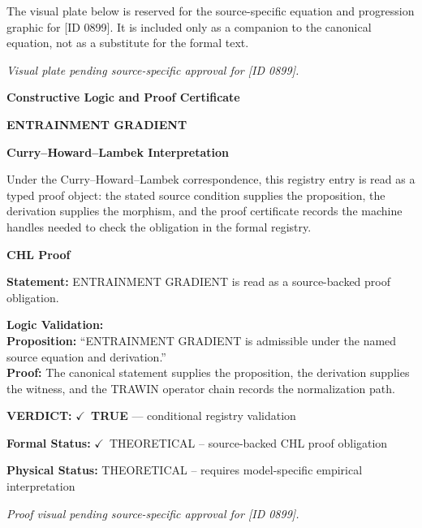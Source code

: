 \begingroup\footnotesize\sloppy
The visual plate below is reserved for the source-specific equation and progression graphic for [ID 0899]. It is included only as a companion to the canonical equation, not as a substitute for the formal text.
\par\endgroup
\begingroup\footnotesize\itshape
Visual plate pending source-specific approval for [ID 0899].
\par\endgroup

\clearpage
\begingroup\tzpsupportsetup
\noindent\textbf{\fontsize{10.8pt}{12.8pt}\selectfont [ID 0899] Constructive Logic and Proof Certificate}\par
\noindent\textbf{\fontsize{10pt}{12pt}\selectfont ENTRAINMENT GRADIENT}\par
\vspace{0.45em}
\begingroup
\footnotesize
\setlength{\parskip}{0.22em}
\setlength{\parindent}{0pt}
\noindent\textbf{Curry--Howard--Lambek Interpretation}\par
Under the Curry--Howard--Lambek correspondence, this registry entry is read as a typed proof
object: the stated source condition supplies the proposition, the derivation supplies the
morphism, and the proof certificate records the machine handles needed to check the obligation
in the formal registry.

\vspace{0.45em}
\noindent\textbf{CHL Proof}\par
\textbf{Statement:} ENTRAINMENT GRADIENT is read as a source-backed proof obligation.

\textbf{Logic Validation:}\\
\textbf{Proposition:} ``ENTRAINMENT GRADIENT is admissible under the named source equation and derivation.''\\
\textbf{Proof:} The canonical statement supplies the proposition, the derivation supplies the witness, and the TRAWIN operator chain records the normalization path.

\textbf{VERDICT:} \ensuremath{\checkmark}\ \textbf{TRUE} --- conditional registry validation

\textbf{Formal Status:} \ensuremath{\checkmark}\ THEORETICAL -- source-backed CHL proof obligation

\textbf{Physical Status:} THEORETICAL -- requires model-specific empirical interpretation
\par\vspace{0.45em}
\par
\vfill
\begingroup\footnotesize\itshape
Proof visual pending source-specific approval for [ID 0899].
\par\endgroup
\vfill
\endgroup
\endgroup
